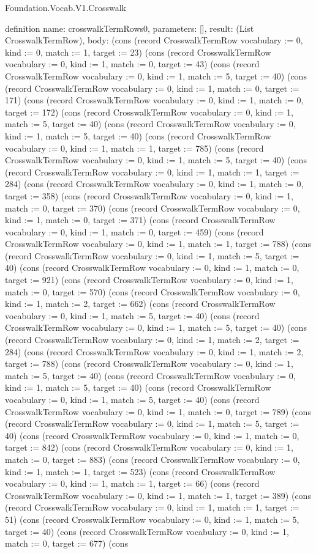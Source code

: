 \begin{lexlean}{Foundation.Vocab.V1.Crosswalk}
\begin{semanticmodule}
definition{
  name: crosswalkTermRows0,
  parameters: [],
  result: (List CrosswalkTermRow),
  body: (cons (record CrosswalkTermRow {vocabulary := 0, kind := 0, match := 1, target := 23}) (cons (record CrosswalkTermRow {vocabulary := 0, kind := 1, match := 0, target := 43}) (cons (record CrosswalkTermRow {vocabulary := 0, kind := 1, match := 5, target := 40}) (cons (record CrosswalkTermRow {vocabulary := 0, kind := 1, match := 0, target := 171}) (cons (record CrosswalkTermRow {vocabulary := 0, kind := 1, match := 0, target := 172}) (cons (record CrosswalkTermRow {vocabulary := 0, kind := 1, match := 5, target := 40}) (cons (record CrosswalkTermRow {vocabulary := 0, kind := 1, match := 5, target := 40}) (cons (record CrosswalkTermRow {vocabulary := 0, kind := 1, match := 1, target := 785}) (cons (record CrosswalkTermRow {vocabulary := 0, kind := 1, match := 5, target := 40}) (cons (record CrosswalkTermRow {vocabulary := 0, kind := 1, match := 1, target := 284}) (cons (record CrosswalkTermRow {vocabulary := 0, kind := 1, match := 0, target := 358}) (cons (record CrosswalkTermRow {vocabulary := 0, kind := 1, match := 0, target := 370}) (cons (record CrosswalkTermRow {vocabulary := 0, kind := 1, match := 0, target := 371}) (cons (record CrosswalkTermRow {vocabulary := 0, kind := 1, match := 0, target := 459}) (cons (record CrosswalkTermRow {vocabulary := 0, kind := 1, match := 1, target := 788}) (cons (record CrosswalkTermRow {vocabulary := 0, kind := 1, match := 5, target := 40}) (cons (record CrosswalkTermRow {vocabulary := 0, kind := 1, match := 0, target := 921}) (cons (record CrosswalkTermRow {vocabulary := 0, kind := 1, match := 0, target := 570}) (cons (record CrosswalkTermRow {vocabulary := 0, kind := 1, match := 2, target := 662}) (cons (record CrosswalkTermRow {vocabulary := 0, kind := 1, match := 5, target := 40}) (cons (record CrosswalkTermRow {vocabulary := 0, kind := 1, match := 5, target := 40}) (cons (record CrosswalkTermRow {vocabulary := 0, kind := 1, match := 2, target := 284}) (cons (record CrosswalkTermRow {vocabulary := 0, kind := 1, match := 2, target := 788}) (cons (record CrosswalkTermRow {vocabulary := 0, kind := 1, match := 5, target := 40}) (cons (record CrosswalkTermRow {vocabulary := 0, kind := 1, match := 5, target := 40}) (cons (record CrosswalkTermRow {vocabulary := 0, kind := 1, match := 5, target := 40}) (cons (record CrosswalkTermRow {vocabulary := 0, kind := 1, match := 0, target := 789}) (cons (record CrosswalkTermRow {vocabulary := 0, kind := 1, match := 5, target := 40}) (cons (record CrosswalkTermRow {vocabulary := 0, kind := 1, match := 0, target := 842}) (cons (record CrosswalkTermRow {vocabulary := 0, kind := 1, match := 0, target := 883}) (cons (record CrosswalkTermRow {vocabulary := 0, kind := 1, match := 1, target := 523}) (cons (record CrosswalkTermRow {vocabulary := 0, kind := 1, match := 1, target := 66}) (cons (record CrosswalkTermRow {vocabulary := 0, kind := 1, match := 1, target := 389}) (cons (record CrosswalkTermRow {vocabulary := 0, kind := 1, match := 1, target := 51}) (cons (record CrosswalkTermRow {vocabulary := 0, kind := 1, match := 5, target := 40}) (cons (record CrosswalkTermRow {vocabulary := 0, kind := 1, match := 0, target := 677}) (cons }
\end{semanticmodule}
\end{lexlean}
